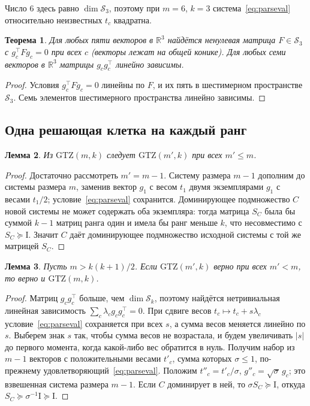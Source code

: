 \documentclass[11pt,a4paper]{article}
\theoremstyle{plain}
\newtheorem{theorem}{Теорема}[section]
\newtheorem{lemma}[theorem]{Лемма}
\theoremstyle{definition}
\theoremstyle{remark}
\newcommand{\RR}{\mathbb{R}}
\newcommand{\Id}{\mathrm{I}}
\newcommand{\GTZ}{\mathrm{GTZ}}
\newcommand{\Sk}{\mathcal{S}}
\newcommand{\T}{^{\!\top}}
\begin{document}
Число $6$ здесь равно $\dim\Sk_3$, поэтому при $m=6$, $k=3$
система~\eqref{eq:parseval} относительно неизвестных $t_c$ квадратна.

\begin{theorem}\label{thm:sizegap}
Для любых пяти векторов в $\RR^3$ найдётся ненулевая матрица $F\in\Sk_3$ с
$g_c\T Fg_c=0$ при всех $c$ (векторы лежат на общей конике). Для любых семи
векторов в $\RR^3$ матрицы $g_cg_c\T$ линейно зависимы.
\end{theorem}
\begin{proof}
Условия $g_c\T Fg_c=0$ линейны по $F$, и их пять в шестимерном пространстве
$\Sk_3$. Семь элементов шестимерного пространства линейно зависимы.
\end{proof}

\subsection{Одна решающая клетка на каждый ранг}

\begin{lemma}\label{lem:mono}
Из $\GTZ(m,k)$ следует $\GTZ(m',k)$ при всех $m'\le m$.
\end{lemma}
\begin{proof}
Достаточно рассмотреть $m'=m-1$. Систему размера $m-1$ дополним до системы
размера $m$, заменив вектор $g_1$ с весом $t_1$ двумя экземплярами $g_1$ с
весами $t_1/2$; условие~\eqref{eq:parseval} сохранится. Доминирующее
подмножество $C$ новой системы не может содержать оба экземпляра: тогда
матрица $S_C$ была бы суммой $k-1$ матриц ранга один и имела бы ранг меньше
$k$, что несовместимо с $S_C\succeq\Id$. Значит $C$ даёт доминирующее
подмножество исходной системы с той же матрицей $S_C$.
\end{proof}

\begin{lemma}\label{lem:walk}
Пусть $m>k(k+1)/2$. Если $\GTZ(m',k)$ верно при всех $m'<m$, то верно и
$\GTZ(m,k)$.
\end{lemma}
\begin{proof}
Матриц $g_cg_c\T$ больше, чем $\dim\Sk_k$, поэтому найдётся нетривиальная
линейная зависимость $\sum_c\lambda_cg_cg_c\T=0$. При сдвиге весов
$t_c\mapsto t_c+s\lambda_c$ условие~\eqref{eq:parseval} сохраняется при всех
$s$, а сумма весов меняется линейно по $s$. Выберем знак $s$ так, чтобы сумма
весов не возрастала, и будем увеличивать $|s|$ до первого момента, когда
какой-либо вес обратится в нуль. Получим набор из $m-1$ векторов с
положительными весами $t'_c$, сумма которых $\sigma\le1$, по-прежнему
удовлетворяющий~\eqref{eq:parseval}. Положим $t''_c=t'_c/\sigma$,
$g''_c=\sqrt\sigma\,g_c$; это взвешенная система размера $m-1$. Если $C$
доминирует в ней, то $\sigma S_C\succeq\Id$, откуда
$S_C\succeq\sigma^{-1}\Id\succeq\Id$.
\end{proof}
\end{document}
